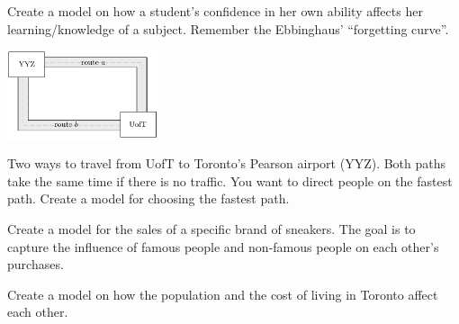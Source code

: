 \begin{exercises}
\begin{problist}
	\prob Create a model on how a student's confidence in her own ability affects her learning/knowledge of a subject. Remember the Ebbinghaus' ``forgetting curve''.

	\begin{center}
		\includegraphics*[width=125pt]{images/module15-UofT2YYZ.pdf}	
	\end{center}

	\prob Two ways to travel from UofT to Toronto's Pearson airport (YYZ). Both paths take the same time if there is no traffic. You want to direct people on the fastest path. Create a model for choosing the fastest path.
	
	
	\prob Create a model for the sales of a specific brand of sneakers. The goal is to capture the influence of famous people and non-famous people on each other's purchases.
	
	\prob Create a model on how the population and the cost of living in Toronto affect each other.
	
	
	\end{problist}
\end{exercises}
